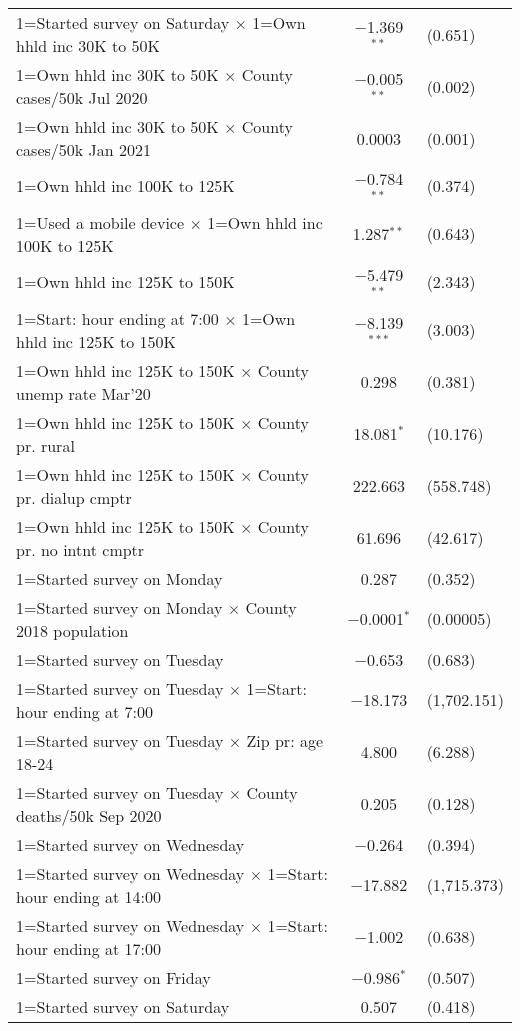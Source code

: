 \begin{table}[!htbp]
\begin{tabular}{@{\extracolsep{5pt}}lc}
  1=Started survey on Saturday $\times$ 1=Own hhld inc 30K to 50K & $-$1.369$^{**}$ & (0.651) \\ 
  1=Own hhld inc 30K to 50K $\times$ County cases/50k Jul 2020 & $-$0.005$^{**}$ & (0.002) \\ 
  1=Own hhld inc 30K to 50K $\times$ County cases/50k Jan 2021 & 0.0003 & (0.001) \\ 
  1=Own hhld inc 100K to 125K & $-$0.784$^{**}$ & (0.374) \\ 
  1=Used a mobile device $\times$ 1=Own hhld inc 100K to 125K & 1.287$^{**}$ & (0.643) \\ 
  1=Own hhld inc 125K to 150K & $-$5.479$^{**}$ & (2.343) \\ 
  1=Start: hour ending at 7:00 $\times$ 1=Own hhld inc 125K to 150K & $-$8.139$^{***}$ & (3.003) \\ 
  1=Own hhld inc 125K to 150K $\times$ County unemp rate Mar'20 & 0.298 & (0.381) \\ 
  1=Own hhld inc 125K to 150K $\times$ County pr. rural & 18.081$^{*}$ & (10.176) \\ 
  1=Own hhld inc 125K to 150K $\times$ County pr. dialup cmptr & 222.663 & (558.748) \\ 
  1=Own hhld inc 125K to 150K $\times$ County pr. no intnt cmptr & 61.696 & (42.617) \\ 
  1=Started survey on Monday & 0.287 & (0.352) \\ 
  1=Started survey on Monday $\times$ County 2018 population & $-$0.0001$^{*}$ & (0.00005) \\ 
  1=Started survey on Tuesday & $-$0.653 & (0.683) \\ 
  1=Started survey on Tuesday $\times$ 1=Start: hour ending at 7:00 & $-$18.173 & (1,702.151) \\ 
  1=Started survey on Tuesday $\times$ Zip pr: age 18-24 & 4.800 & (6.288) \\ 
  1=Started survey on Tuesday $\times$ County deaths/50k Sep 2020 & 0.205 & (0.128) \\ 
  1=Started survey on Wednesday & $-$0.264 & (0.394) \\ 
  1=Started survey on Wednesday $\times$ 1=Start: hour ending at 14:00 & $-$17.882 & (1,715.373) \\ 
  1=Started survey on Wednesday $\times$ 1=Start: hour ending at 17:00 & $-$1.002 & (0.638) \\ 
  1=Started survey on Friday & $-$0.986$^{*}$ & (0.507) \\ 
  1=Started survey on Saturday & 0.507 & (0.418) \\ 

\end{tabular}
\end{table}
